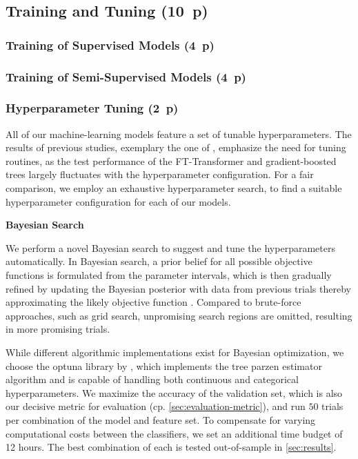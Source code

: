 \subsection{Training and Tuning (10~p)}\label{sec:training-and-tuning}

\subsubsection{Training of Supervised
    Models (4~p)}\label{sec:training-of-supervised-models}

\subsubsection{Training of Semi-Supervised
    Models (4~p)}\label{sec:training-of-semi-supervised-models}


\subsubsection{Hyperparameter Tuning (2~p)}\label{sec:hyperparameter-tuning}

All of our machine-learning models feature a set of tunable hyperparameters. The results of previous studies, exemplary the one of \textcite[][5]{grinsztajnWhyTreebasedModels2022}, emphasize the need for tuning routines, as the test performance of the FT-Transformer and gradient-boosted trees largely fluctuates with the hyperparameter configuration.  For a fair comparison, we employ an exhaustive hyperparameter search, to find a suitable hyperparameter configuration for each of our models.

\textbf{Bayesian Search}

We perform a novel Bayesian search to suggest and tune the hyperparameters automatically. In Bayesian search, a prior belief for all possible objective functions is formulated from the parameter intervals, which is then gradually refined by updating the Bayesian posterior with data from previous trials thereby approximating the likely objective function \autocite[][2]{shahriariTakingHumanOut2016}. Compared to brute-force approaches, such as grid search, unpromising search regions are omitted, resulting in more promising trials.

While different algorithmic implementations exist for Bayesian optimization, we choose the optuna library by \textcite[][1--10]{akibaOptunaNextgenerationHyperparameter2019}, which implements the tree parzen estimator algorithm and is capable of handling both continuous and categorical hyperparameters. We maximize the accuracy of the validation set, which is also our decisive metric for evaluation (cp. \cref{sec:evaluation-metric}), and run $50$ trials per combination of the model and feature set. To compensate for varying computational costs between the classifiers, we set an additional time budget of 12 hours. The best combination of each is tested out-of-sample in \cref{sec:results}.

